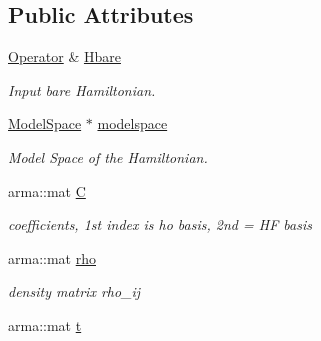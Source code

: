 \subsection*{Public Attributes}
\begin{DoxyCompactItemize}
\item 
\hypertarget{classHartreeFock_aad1a5eeadedf9689bbfc2e3d71b60aee}{\hyperlink{classOperator}{Operator} \& \hyperlink{classHartreeFock_aad1a5eeadedf9689bbfc2e3d71b60aee}{Hbare}}\label{classHartreeFock_aad1a5eeadedf9689bbfc2e3d71b60aee}

\begin{DoxyCompactList}\small\item\em Input bare Hamiltonian. \end{DoxyCompactList}\item 
\hypertarget{classHartreeFock_a5d4a6814a338d7e4c17575ac74763f30}{\hyperlink{classModelSpace}{Model\-Space} $\ast$ \hyperlink{classHartreeFock_a5d4a6814a338d7e4c17575ac74763f30}{modelspace}}\label{classHartreeFock_a5d4a6814a338d7e4c17575ac74763f30}

\begin{DoxyCompactList}\small\item\em Model Space of the Hamiltonian. \end{DoxyCompactList}\item 
\hypertarget{classHartreeFock_a9c73247cdb9255cebabaacc99ec55086}{arma\-::mat \hyperlink{classHartreeFock_a9c73247cdb9255cebabaacc99ec55086}{C}}\label{classHartreeFock_a9c73247cdb9255cebabaacc99ec55086}

\begin{DoxyCompactList}\small\item\em coefficients, 1st index is ho basis, 2nd = H\-F basis \end{DoxyCompactList}\item 
\hypertarget{classHartreeFock_a6fc0aa9f25640979d5188443a19aeea5}{arma\-::mat \hyperlink{classHartreeFock_a6fc0aa9f25640979d5188443a19aeea5}{rho}}\label{classHartreeFock_a6fc0aa9f25640979d5188443a19aeea5}

\begin{DoxyCompactList}\small\item\em density matrix rho\-\_\-ij \end{DoxyCompactList}\item 
\hypertarget{classHartreeFock_ac0574a970910f77d873a8f2b9beb8441}{arma\-::mat \hyperlink{classHartreeFock_ac0574a970910f77d873a8f2b9beb8441}{t}}\label{classHartreeFock_ac0574a970910f77d873a8f2b9beb8441}


\end{DoxyCompactItemize}
